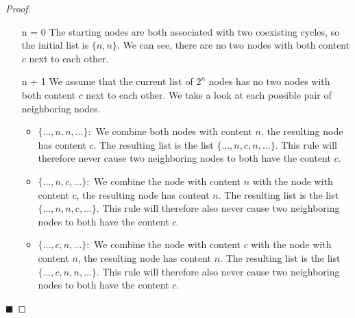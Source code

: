 \begin{proof}
	\begin{itemize}
		\item[n = 0] The starting nodes are both associated with two coexisting cycles, so the initial list is $\{n, n\}$.
			We can see, there are no two nodes with both content $c$ next to each other. \checkmark
		\item[n + 1] We assume that the current list of $2^n$ nodes has no two nodes with both content $c$ next to each other.
			We take a look at each possible pair of neighboring nodes.
			\begin{itemize}
				\item $\{\dots, n, n, \dots\}:$ We combine both nodes with content $n$, the resulting node has content $c$.
				      The resulting list is the list $\{\dots, n, c, n, \dots\}$.
				      This rule will therefore never cause two neighboring nodes to both have the content $c$.
				\item $\{\dots, n, c, \dots\}:$ We combine the node with content $n$ with the node with content $c$, the resulting node has content $n$.
				      The resulting list is the list $\{\dots, n, n, c, \dots\}$.
				      This rule will therefore also never cause two neighboring nodes to both have the content $c$.
				\item $\{\dots, c, n, \dots\}:$ We combine the node with content $c$ with the node with content $n$, the resulting node has content $n$.
				      The resulting list is the list $\{\dots, c, n, n, \dots\}$.
				      This rule will therefore also never cause two neighboring nodes to both have the content $c$.
			\end{itemize}
	\end{itemize}
	\hfill $\blacksquare$
\end{proof}
